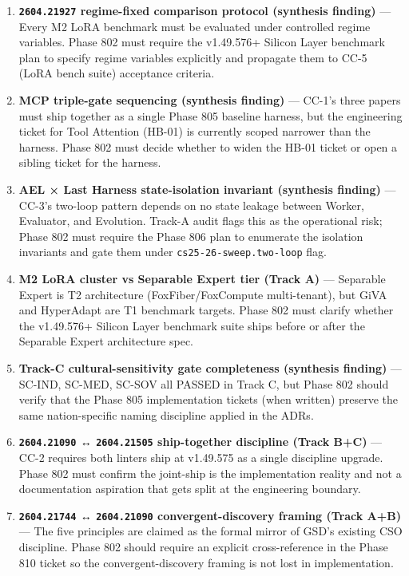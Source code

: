 \documentclass[11pt,letterpaper]{article}
\newcommand{\arxivid}[1]{\texttt{\textcolor{accent}{#1}}}
\begin{document}
\begin{enumerate}
  (cultural-sensitivity Safety Warden) and CC-2 (SKILL.md authoring)
  both touch federated-skill futures; Phase 802 must verify the citation
  is present in every federated-economy adjacent recommendation that
  lands in v1.49.575 Half B.
\item
  \textbf{\arxivid{2604.21927} regime-fixed comparison protocol
  (synthesis finding)} --- Every M2 LoRA benchmark must be evaluated
  under controlled regime variables. Phase 802 must require the
  v1.49.576+ Silicon Layer benchmark plan to specify regime variables
  explicitly and propagate them to CC-5 (LoRA bench suite) acceptance
  criteria.
\item
  \textbf{MCP triple-gate sequencing (synthesis finding)} --- CC-1's
  three papers must ship together as a single Phase 805 baseline
  harness, but the engineering ticket for Tool Attention (HB-01) is
  currently scoped narrower than the harness. Phase 802 must decide
  whether to widen the HB-01 ticket or open a sibling ticket for the
  harness.
\item
  \textbf{AEL × Last Harness state-isolation invariant (synthesis
  finding)} --- CC-3's two-loop pattern depends on no state leakage
  between Worker, Evaluator, and Evolution. Track-A audit flags this as
  the operational risk; Phase 802 must require the Phase 806 plan to
  enumerate the isolation invariants and gate them under
  \texttt{cs25-26-sweep.two-loop} flag.
\item
  \textbf{M2 LoRA cluster vs Separable Expert tier (Track A)} ---
  Separable Expert is T2 architecture (FoxFiber/FoxCompute
  multi-tenant), but GiVA and HyperAdapt are T1 benchmark targets. Phase
  802 must clarify whether the v1.49.576+ Silicon Layer benchmark suite
  ships before or after the Separable Expert architecture spec.
\item
  \textbf{Track-C cultural-sensitivity gate completeness (synthesis
  finding)} --- SC-IND, SC-MED, SC-SOV all PASSED in Track C, but Phase
  802 should verify that the Phase 805 implementation tickets (when
  written) preserve the same nation-specific naming discipline applied
  in the ADRs.
\item
  \textbf{\arxivid{2604.21090} ↔ \arxivid{2604.21505} ship-together
  discipline (Track B+C)} --- CC-2 requires both linters ship at
  v1.49.575 as a single discipline upgrade. Phase 802 must confirm the
  joint-ship is the implementation reality and not a documentation
  aspiration that gets split at the engineering boundary.
\item
  \textbf{\arxivid{2604.21744} ↔ \arxivid{2604.21090} convergent-discovery
  framing (Track A+B)} --- The five principles are claimed as the formal
  mirror of GSD's existing CSO discipline. Phase 802 should require an
  explicit cross-reference in the Phase 810 ticket so the
  convergent-discovery framing is not lost in implementation.
\end{enumerate}
\end{document}
